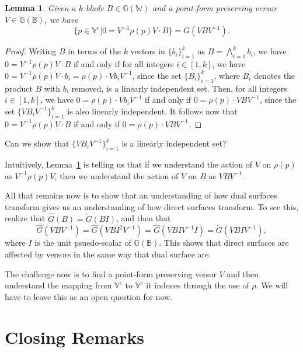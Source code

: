 \documentclass{birkjour}
\newtheorem{lem}[thm]{Lemma}
\theoremstyle{definition}
\theoremstyle{remark}
\numberwithin{equation}{section}
\newcommand{\G}{\mathbb{G}}
\newcommand{\V}{\mathbb{V}}
\newcommand{\W}{\mathbb{W}}
\newcommand{\B}{\mathbb{B}}
\newcommand{\Gi}{\dot{G}}
\newcommand{\Go}{\hat{G}}
\begin{document}
\begin{lem}\label{lem_xform_dual_geo}
Given a $k$-blade $B\in\G(\W)$ and a point-form preserving versor $V\in\G(\B)$,
we have
\begin{equation}
\{p\in\V^e|0=V^{-1}\rho(p)V\cdot B\}=\Gi(VBV^{-1}).
\end{equation}
\end{lem}
\begin{proof}
Writing $B$ in terms of the $k$ vectors in $\{b_i\}_{i=1}^k$ as $B=\bigwedge_{i=1}^k b_i$,
we have $0=V^{-1}\rho(p)V\cdot B$ if and only if for all integers $i\in[1,k]$,
we have $0=V^{-1}\rho(p)V\cdot b_i=\rho(p)\cdot Vb_iV^{-1}$, since the
set $\{B_i\}_{i=1}^k$, where $B_i$ denotes the product $B$ with $b_i$ removed,
is a linearly independent set.  Then, for all integers $i\in[1,k]$, we have $0=\rho(p)\cdot Vb_iV^{-1}$
if and only if $0=\rho(p)\cdot VBV^{-1}$, since
the set $\{VB_iV^{-1}\}_{i=1}^k$ is also linearly independent.
It follows now that $0=V^{-1}\rho(p)V\cdot B$ if and only if $0=\rho(p)\cdot VBV^{-1}$.
\end{proof}

Can we show that $\{VB_iV^{-1}\}_{i=1}^k$ is a linearly independent set?

Intuitively, Lemma~\ref{lem_xform_dual_geo} is telling us that if
we understand the action of $V$ on $\rho(p)$ as $V^{-1}\rho(p)V$,
then we understand the action of $V$ on $B$ as $VBV^{-1}$.

All that remains now is to show that an understanding of how dual surfaces
transform gives us an understanding of how direct surfaces transform.
To see this, realize that $\Go(B)=\Gi(BI)$, and then that
\begin{equation}
\Go(VBV^{-1})=\Go(VBI^2V^{-1})=\Go(VBIV^{-1}I)=\Gi(VBIV^{-1}),
\end{equation}
where $I$ is the unit psuedo-scalar of $\G(\B)$.  This shows that
direct surfaces are affected by versors in the same way that dual surface are.

The challenge now is to find a point-form preserving versor $V$ and then
understand the mapping from $\V^e$ to $\V^e$ it induces through
the use of $\rho$.  We will have to leave this as
an open question for now.

\section{Closing Remarks}
\end{document}
